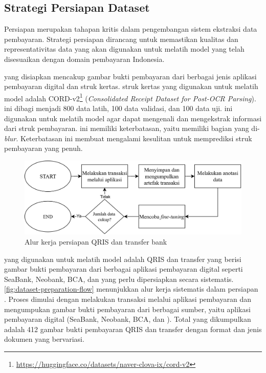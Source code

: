\subsection{Strategi Persiapan Dataset}
\label{subsec:strategi-persiapan-dataset}

Persiapan \dataset{} merupakan tahapan kritis dalam pengembangan sistem ekstraksi data pembayaran. Strategi persiapan \dataset{} dirancang untuk memastikan kualitas dan representativitas data yang akan digunakan untuk melatih model \donut{} yang telah disesuaikan dengan domain pembayaran Indonesia.

\datasetfl{} yang disiapkan mencakup gambar bukti pembayaran dari berbagai jenis aplikasi pembayaran digital dan struk kertas. \datasetfl{} struk kertas yang digunakan untuk melatih model \donut{} adalah \dataset{} CORD-v2\footnote{\href{https://huggingface.co/datasets/naver-clova-ix/cord-v2}{https://huggingface.co/datasets/naver-clova-ix/cord-v2}} (\emph{Consolidated Receipt Dataset for Post-OCR Parsing}). \datasetfl{} ini dibagi menjadi 800 data latih, 100 data validasi, dan 100 data uji. \datasetfl{} ini digunakan untuk melatih model \donut{} agar dapat mengenali dan mengekstrak informasi dari struk pembayaran. \datasetfl{} ini memiliki keterbatasan, yaitu memiliki bagian yang di-\emph{blur}. Keterbatasan ini membuat \donut{} mengalami kesulitan untuk memprediksi struk pembayaran yang penuh.
\begin{figure}[htbp]
    \centering
    \includegraphics[width=1\textwidth]{images/dataset-preparation-flow.png}
    \caption{Alur kerja persiapan \dataset{} QRIS dan transfer bank}
    \label{fig:dataset-preparation-flow}
\end{figure}

\datasetfl{} yang digunakan untuk melatih model \donut{} adalah \dataset{} QRIS dan transfer yang berisi gambar bukti pembayaran dari berbagai aplikasi pembayaran digital seperti SeaBank, Neobank, BCA, dan \gopay{} yang perlu dipersiapkan secara sistematis. \autoref{fig:dataset-preparation-flow} menunjukkan alur kerja sistematis dalam persiapan \dataset. Proses dimulai dengan melakukan transaksi melalui aplikasi pembayaran dan mengumpukan gambar bukti pembayaran dari berbagai sumber, yaitu aplikasi pembayaran digital (SeaBank, Neobank, BCA, dan \gopay). Total \dataset{} yang dikumpulkan adalah 412 gambar bukti pembayaran QRIS dan transfer dengan format dan jenis dokumen yang bervariasi.

